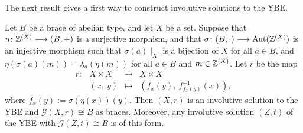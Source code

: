 


The next result gives a first way to construct
involutive solutions to the YBE. 

\begin{proposition}\label{BenDavid}
	Let $B$ be a brace of abelian type, and let $X$ be a set.  Suppose that
	$\eta\colon \mathbb{Z}^{(X)}\longrightarrow (B,+)$ is a surjective morphism,
	and that $\sigma\colon (B,\cdot)\longrightarrow\operatorname{Aut}(\mathbb{Z}^{(X)})$ is an
	injective morphism such that $\sigma(a)\mid_X$ is a bijection of $X$
	for all $a\in B$, and $\eta(\sigma(a)(m))=\lambda_a(\eta(m))$ for
	all $a\in B$ and $m\in\mathbb{Z}^{(X)}$. Let $r$ be the map
	$$
	\begin{array}{cccc}
		r\colon & X\times X &\longrightarrow & X\times X\\
		& (x,~y) &\mapsto &(f_{x}(y),~f^{-1}_{f_{x}(y)}(x)),
	\end{array}
	$$
	where $f_x(y):=\sigma(\eta(x))(y)$. Then $(X,r)$ is an involutive solution to
	the YBE and $\mathcal{G}(X,r)\cong B$ as braces. Moreover, any
	involutive solution $(Z,t)$ of the YBE with $\mathcal{G}(Z,t)\cong B$ is of
	this form.
\end{proposition}
